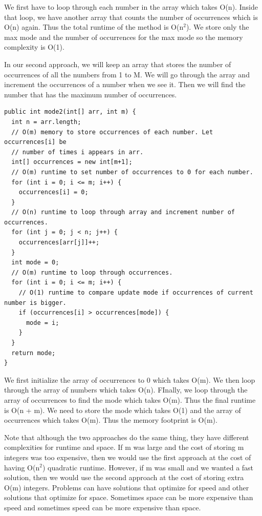 \documentclass[11pt,oneside]{book}
\begin{document}
We first have to loop through each number in the array which takes O(n). Inside that loop, we have another array that counts the number of occurrences which is O(n) again. Thus the total runtime of the method is O(n$^{2}$). We store only the max mode and the number of occurrences for the max mode so the memory complexity is O(1).

In our second approach, we will keep an array that stores the number of occurrences of all the numbers from 1 to M. We will go through the array and increment the occurrences of a number when we see it. Then we will find the number that has the maximum number of occurrences.

\begin{lstlisting}
public int mode2(int[] arr, int m) {
  int n = arr.length;
  // O(m) memory to store occurrences of each number. Let occurrences[i] be 
  // number of times i appears in arr.
  int[] occurrences = new int[m+1];
  // O(m) runtime to set number of occurrences to 0 for each number.
  for (int i = 0; i <= m; i++) {
    occurrences[i] = 0;
  }
  // O(n) runtime to loop through array and increment number of occurrences.
  for (int j = 0; j < n; j++) {
    occurrences[arr[j]]++;
  }
  int mode = 0;
  // O(m) runtime to loop through occurrences.
  for (int i = 0; i <= m; i++) {
    // O(1) runtime to compare update mode if occurrences of current number is bigger.
    if (occurrences[i] > occurrences[mode]) {
      mode = i;
    }
  }
  return mode;
}
\end{lstlisting}

We first initialize the array of occurrences to 0 which takes O(m). We then loop through the array of numbers which takes O(n). FInally, we loop through the array of occurrences to find the mode which takes O(m). Thus the final runtime is O(n + m). We need to store the mode which takes O(1) and the array of occurrences which takes O(m). Thus the memory footprint is O(m).

Note that although the two approaches do the same thing, they have different complexities for runtime and space. If m was large and the cost of storing m integers was too expensive, then we would use the first approach at the cost of having O(n$^{2}$) quadratic runtime. However, if m was small and we wanted a fast solution, then we would use the second approach at the cost of storing extra O(m) integers. Problems can have solutions that optimize for speed and other solutions that optimize for space. Sometimes space can be more expensive than speed and sometimes speed can be more expensive than space.
\end{document}
